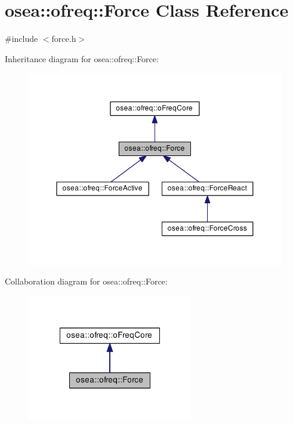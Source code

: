 \hypertarget{classosea_1_1ofreq_1_1_force}{\section{osea\-:\-:ofreq\-:\-:Force Class Reference}
\label{classosea_1_1ofreq_1_1_force}
}


{\ttfamily \#include $<$force.\-h$>$}



Inheritance diagram for osea\-:\-:ofreq\-:\-:Force\-:
\nopagebreak
\begin{figure}[H]
\begin{center}
\leavevmode
\includegraphics[width=350pt]{classosea_1_1ofreq_1_1_force__inherit__graph}
\end{center}
\end{figure}


Collaboration diagram for osea\-:\-:ofreq\-:\-:Force\-:
\nopagebreak
\begin{figure}[H]
\begin{center}
\leavevmode
\includegraphics[width=204pt]{classosea_1_1ofreq_1_1_force__coll__graph}
\end{center}
\end{figure}
